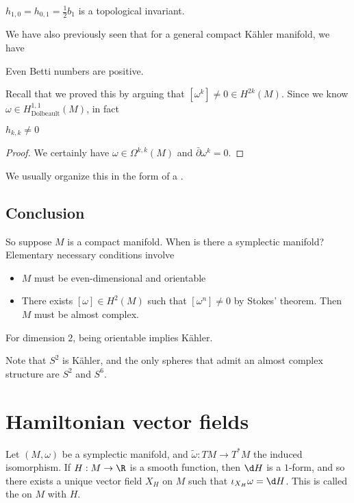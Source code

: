 \documentclass[a4paper]{article}
\newcommand\Dolb{\mathrm{Dolbeault}}
\begin{document}
\begin{cor}
  $h_{1, 0} = h_{0, 1} = \frac{1}{2}b_1$ is a topological invariant.
\end{cor}

We have also previously seen that for a general compact K\"ahler manifold, we have
\begin{prop}
  Even Betti numbers are positive.
\end{prop}

Recall that we proved this by arguing that $[\omega^k] \not= 0 \in H^{2k}(M)$. Since we know $\omega \in H^{1,1}_{\Dolb}(M)$, in fact
\begin{prop}
  $h_{k, k} \not= 0$
\end{prop}

\begin{proof}
  We certainly have $\omega \in \Omega^{k, k}(M)$ and $\bar{\partial} \omega^k = 0$. %
\end{proof}


We usually organize this in the form of a .
\subsection{Conclusion}
So suppose $M$ is a compact manifold. When is there a symplectic manifold? Elementary necessary conditions involve
\begin{itemize}
  \item $M$ must be even-dimensional and orientable
  \item There exists $[\omega] \in H^2(M)$ such that $[\omega^n] \not= 0$ by Stokes' theorem. Then $M$ must be almost complex.
\end{itemize}

For dimension $2$, being orientable implies K\"ahler.

Note that $S^2$ is K\"ahler, and the only spheres that admit an almost complex structure are $S^2$ and $S^6$.
\section{Hamiltonian vector fields}
Let $(M, \omega)$ be a symplectic manifold, and $\tilde{\omega}: TM \to T^*M$ the induced isomorphism. If $H: M \to \R$ is a smooth function, then $\d H$ is a $1$-form, and so there exists a unique vector field $X_H$ on $M$ such that $\iota_{X_H}\omega = \d H$. This is called the  on $M$ with  $H$.
\end{document}
